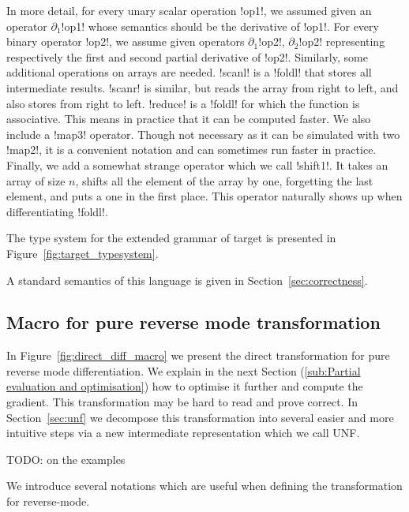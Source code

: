 

In more detail, for every unary scalar operation !op1!, 
we assumed given an operator $\partial_1$!op1! whose semantics should be the derivative of !op1!.
For every binary operator !op2!, we assume given operators $\partial_1$!op2!, $\partial_2$!op2! 
representing respectively the first and second partial derivative of !op2!.
Similarly, some additional operations on arrays are needed. 
!scanl! is a !foldl! that stores all intermediate results. 
!scanr! is similar, but reads the array from right to left, and also stores from right to left.
!reduce! is a !foldl! for which the function is associative. 
This means in practice that it can be computed faster.
We also include a !map3! operator. 
Though not necessary as it can be simulated with two !map2!, it is a convenient notation and can sometimes run faster in practice.
Finally, we add a somewhat strange operator which we call !shift1!. 
It takes an array of size $n$,  shifts all the element of the array by one, 
forgetting the last element, and puts a one in the first place. 
This operator naturally shows up when differentiating !foldl!.

The type system for the extended grammar of target is presented in Figure~\ref{fig:target_typesystem}. 



A standard semantics of this language is given in Section~\ref{sec:correctness}.

\subsection{Macro for pure reverse mode transformation} %
\label{sub:Macro for pure reverse mode transformation}

In Figure~\ref{fig:direct_diff_macro} we present the direct transformation for pure reverse mode differentiation.
We explain in the next Section (\ref{sub:Partial evaluation and optimisation}) how to optimise it further and compute the gradient.
This transformation may be hard to read and prove correct. 
In Section~\ref{sec:unf} we decompose this transformation into several easier 
and more intuitive steps via a new intermediate representation which we call UNF.

TODO: on the examples

We introduce several notations which are useful when defining the transformation for reverse-mode.



